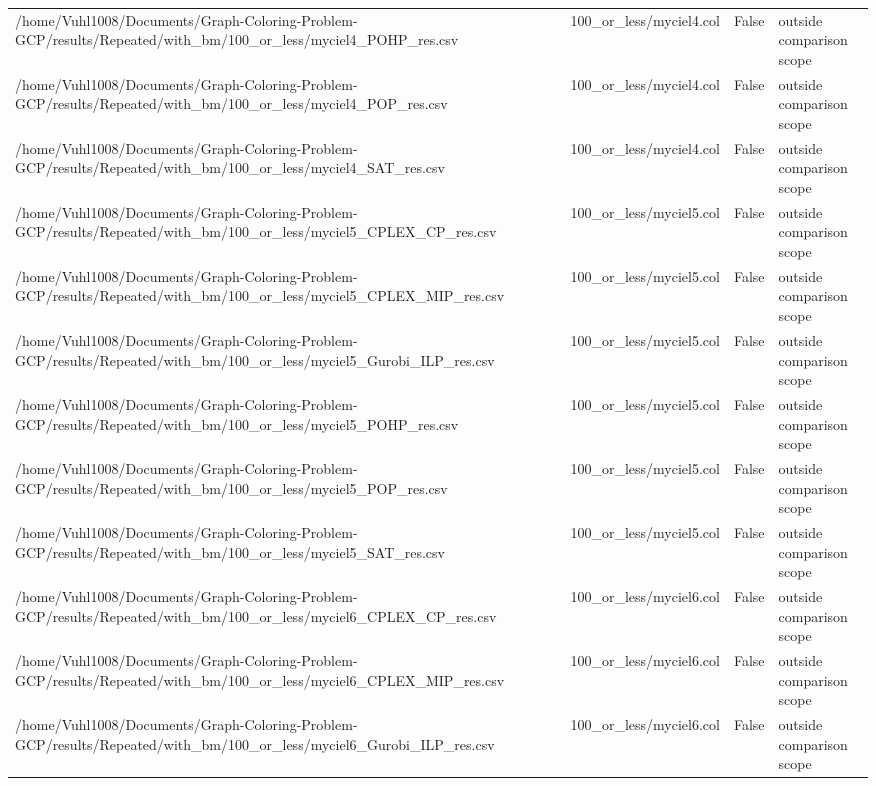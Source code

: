 \begin{table}[htbp]
\begin{tabular}{llll}
/home/Vuhl1008/Documents/Graph-Coloring-Problem-GCP/results/Repeated/with\_bm/100\_or\_less/myciel4\_POHP\_res.csv & 100\_or\_less/myciel4.col & False & outside comparison scope \\
/home/Vuhl1008/Documents/Graph-Coloring-Problem-GCP/results/Repeated/with\_bm/100\_or\_less/myciel4\_POP\_res.csv & 100\_or\_less/myciel4.col & False & outside comparison scope \\
/home/Vuhl1008/Documents/Graph-Coloring-Problem-GCP/results/Repeated/with\_bm/100\_or\_less/myciel4\_SAT\_res.csv & 100\_or\_less/myciel4.col & False & outside comparison scope \\
/home/Vuhl1008/Documents/Graph-Coloring-Problem-GCP/results/Repeated/with\_bm/100\_or\_less/myciel5\_CPLEX\_CP\_res.csv & 100\_or\_less/myciel5.col & False & outside comparison scope \\
/home/Vuhl1008/Documents/Graph-Coloring-Problem-GCP/results/Repeated/with\_bm/100\_or\_less/myciel5\_CPLEX\_MIP\_res.csv & 100\_or\_less/myciel5.col & False & outside comparison scope \\
/home/Vuhl1008/Documents/Graph-Coloring-Problem-GCP/results/Repeated/with\_bm/100\_or\_less/myciel5\_Gurobi\_ILP\_res.csv & 100\_or\_less/myciel5.col & False & outside comparison scope \\
/home/Vuhl1008/Documents/Graph-Coloring-Problem-GCP/results/Repeated/with\_bm/100\_or\_less/myciel5\_POHP\_res.csv & 100\_or\_less/myciel5.col & False & outside comparison scope \\
/home/Vuhl1008/Documents/Graph-Coloring-Problem-GCP/results/Repeated/with\_bm/100\_or\_less/myciel5\_POP\_res.csv & 100\_or\_less/myciel5.col & False & outside comparison scope \\
/home/Vuhl1008/Documents/Graph-Coloring-Problem-GCP/results/Repeated/with\_bm/100\_or\_less/myciel5\_SAT\_res.csv & 100\_or\_less/myciel5.col & False & outside comparison scope \\
/home/Vuhl1008/Documents/Graph-Coloring-Problem-GCP/results/Repeated/with\_bm/100\_or\_less/myciel6\_CPLEX\_CP\_res.csv & 100\_or\_less/myciel6.col & False & outside comparison scope \\
/home/Vuhl1008/Documents/Graph-Coloring-Problem-GCP/results/Repeated/with\_bm/100\_or\_less/myciel6\_CPLEX\_MIP\_res.csv & 100\_or\_less/myciel6.col & False & outside comparison scope \\
/home/Vuhl1008/Documents/Graph-Coloring-Problem-GCP/results/Repeated/with\_bm/100\_or\_less/myciel6\_Gurobi\_ILP\_res.csv & 100\_or\_less/myciel6.col & False & outside comparison scope \\

\end{tabular}
\end{table}
